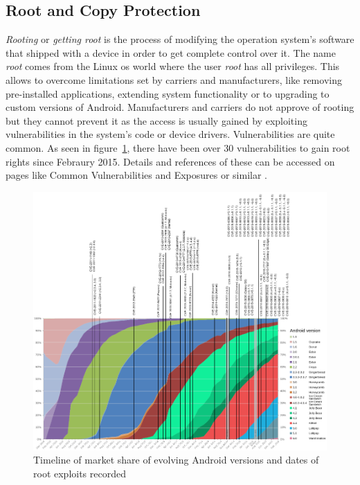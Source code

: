 \subsection{Root and Copy Protection} \label{subsection:android-copyroot}
\textit{Rooting} or \textit{getting root} is the process of modifying the operation system's software that shipped with a device in order to get complete control over it.
The name \textit{root} comes from the Linux \gls{os} world where the user \textit{root} has all privileges.
This allows to overcome limitations set by carriers and manufacturers, like removing pre-installed applications, extending system functionality or to upgrading to custom versions of Android.
Manufacturers and carriers do not approve of rooting but they cannot prevent it as the access is usually gained by exploiting vulnerabilities in the system's code or device drivers.
Vulnerabilities are quite common.
As seen in figure~\ref{fig:root}, there have been over 30 vulnerabilities to gain root rights since Febraury 2015.
Details and references of these can be accessed on pages like Common Vulnerabilities and Exposures or similar \cite{cveAndroidPriv} \cite{cveDetails}.
\newline
\begin{figure}[h]
    \centering
    \includegraphics[width=1\textwidth]{data/timeline.png}
    \caption{Timeline of market share of evolving Android versions and dates of root exploits recorded \cite{distributionRoot} \cite{androidVulnerabilities} \cite{cveAndroidPriv} \cite{cveDetails}}
    \label{fig:root}
\end{figure}

